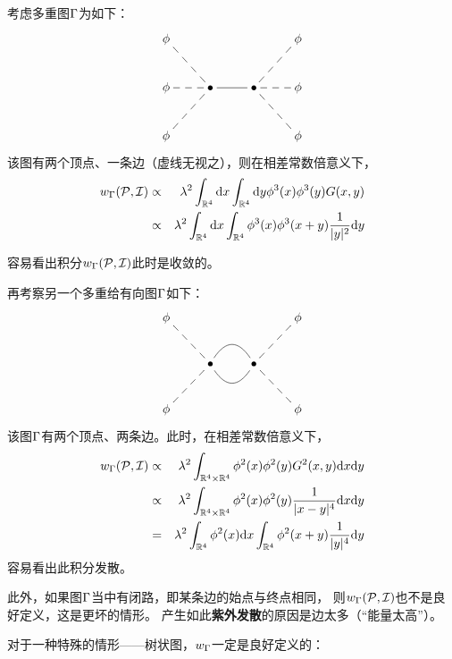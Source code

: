 \begin{example}
考虑多重图$\Gamma$为如下：
$$
  \xymatrix{
     \phi          \ar@{--}[rd]
    &&&\phi        \ar@{--}[ld]
  \\
     \phi          \ar@{--}[r]
    &\bullet       \ar@{-}[r]
    &\bullet
    &\phi          \ar@{--}[l]
  \\
    \phi           \ar@{--}[ru]
    &&&\phi        \ar@{--}[lu]
  }
$$
该图有两个顶点、一条边（虚线无视之），则在相差常数倍意义下，
\begin{eqnarray*}
     w_\Gamma(\mathcal{P},\mathcal{I})
&\propto&
     \lambda^2
     \int_{\mathbb{R}^4}\mathrm{d} x
     \int_{\mathbb{R}^4}\mathrm{d} y
       \phi^3(x)
       \phi^3(y)
       G(x,y)\\
&\propto&
     \lambda^2
     \int_{\mathbb{R}^4}\mathrm{d} x
     \int_{\mathbb{R}^4}
       \phi^3(x)
       \phi^3(x+y)
       \frac{1}{|y|^2}
       \mathrm{d} y
\end{eqnarray*}

容易看出积分$w_\Gamma(\mathcal{P},\mathcal{I})$此时是收敛的。
\label{phi^4费曼规则-example}
\end{example}

\begin{example}
再考察另一个多重给有向图$\Gamma$如下：
$$
  \xymatrix{
     \phi          \ar@{--}[rd]
    &&&\phi        \ar@{--}[ld]
  \\
    &\bullet       \ar@{-}@/^1.3pc/[r]  
                   \ar@{-}@/_1.3pc/[r]
    &\bullet
    &
  \\
    \phi           \ar@{--}[ru]
    &&&\phi        \ar@{--}[lu]
  }
$$
该图$\Gamma$有两个顶点、两条边。此时，在相差常数倍意义下，
\begin{eqnarray*}
     w_\Gamma(\mathcal{P},\mathcal{I})
&\propto&
     \lambda^2
     \int_{\mathbb{R}^4\times\mathbb{R}^4}
       \phi^2(x)\phi^2(y)G^2(x,y)
       \mathrm{d} x\mathrm{d} y\\
&\propto&
     \lambda^2
     \int_{\mathbb{R}^4\times\mathbb{R}^4}
       \phi^2(x)\phi^2(y)
       \frac{1}{|x-y|^4}
       \mathrm{d} x\mathrm{d} y\\
&=&
     \lambda^2
     \int_{\mathbb{R}^4}
       \phi^2(x)
       \mathrm{d} x
     \int_{\mathbb{R}^4}
       \phi^2(x+y)
       \frac{1}{|y|^4}
       \mathrm{d} y
\end{eqnarray*}
容易看出此积分发散。
\label{phi^4费曼规则-发散example}
\end{example}

此外，如果图$\Gamma$当中有闭路，即某条边的始点与终点相同，
则$w_\Gamma(\mathcal{P},\mathcal{I})$也不是良好定义，这是更坏的情形。
产生如此\textbf{紫外发散}的原因是边太多（“能量太高”）。

对于一种特殊的情形——树状图，$w_\Gamma$一定是良好定义的：

